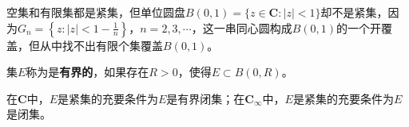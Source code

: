 \documentclass[../../main.tex]{subfiles}
\begin{document}
\begin{example}
空集和有限集都是紧集，但单位圆盘\(B(0, 1) = \{ z \in \mathbf{C} : | z | < 1 \}\)却不是紧集，因为\(G_n = \left\{ z : | z | < 1 - \frac{1}{n} \right\}\)，\(n = 2, 3, \cdots\)，这一串同心圆构成\(B(0, 1)\)的一个开覆盖，但从中找不出有限个集覆盖\(B(0, 1)\)。
\end{example}

\begin{definition}
集\(E\)称为是\textbf{有界的}，如果存在\(R > 0\)，使得\(E \subset B(0, R)\)。
\end{definition}

\begin{theorem}\label{theorem:Heine-Borel定理}
在\(\mathbf{C}\)中，\(E\)是紧集的充要条件为\(E\)是有界闭集；在\(\mathbf{C}_\infty\)中，\(E\)是紧集的充要条件为\(E\)是闭集。
\end{theorem}
\end{document}
